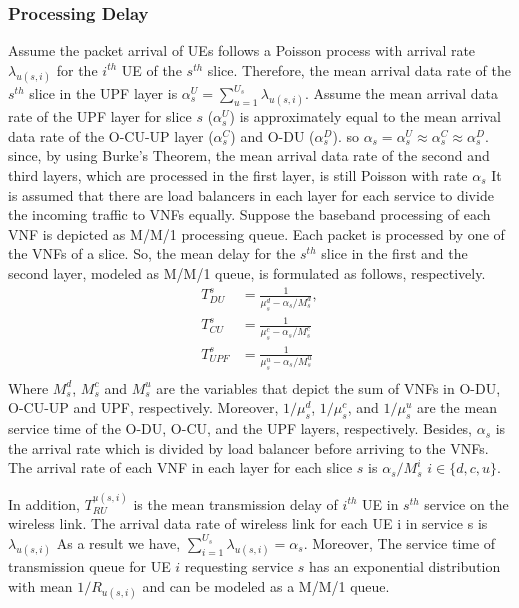 \documentclass[conference]{IEEEtran}
\begin{document}
\subsubsection{Processing Delay}
Assume the packet arrival of UEs follows a Poisson process with arrival rate $\lambda_{u(s,i)}$ for the $i^{th}$ UE of the $s^{th}$ slice.
Therefore, the mean arrival data rate of the $s^{th}$ slice in the UPF layer is $\alpha_{s}^U = \sum_{u=1}^{U_s}\lambda_{u(s,i)}$.
Assume the mean arrival data rate of the UPF layer for slice $s$ ($\alpha_{s}^U$) is approximately equal to the mean arrival data rate of the O-CU-UP layer ($\alpha_{s}^C$) and O-DU ($\alpha_{s}^D$). so $\alpha_{s} =\alpha_{s}^U \approx \alpha_{s}^C \approx \alpha_{s}^D$. since, by using Burke’s Theorem, the mean arrival data rate of the second and third layers, which are processed in the first layer, is still Poisson with rate $\alpha_{s}$
It is assumed that there are load balancers in each layer for each service to divide the incoming traffic to VNFs equally. %
Suppose the baseband processing of each VNF is depicted as M/M/1 processing queue.
Each packet is processed by one of the VNFs of a slice. So, the mean delay for the $s^{th}$ slice in the first and the second layer, modeled as M/M/1 queue, is formulated as follows, respectively.
\begin{equation}
\begin{split}
T_{DU}^{s} &= \frac{1}{\mu_s^d - \alpha_{s}/{M_s^{d}}},\\
T_{CU}^{s} &= \frac{1}{\mu_s^c - \alpha_{s}/{M_s^{c}}}\\
T_{UPF}^{s} &= \frac{1}{\mu_s^u - \alpha_{s}/{M_s^{u}}}\\
\end{split}
\end{equation}
Where $M_s^{d}$, $M_s^{c}$ and 
$M_s^{u}$ are the variables that depict the sum of VNFs in O-DU, O-CU-UP and UPF, respectively. 
Moreover, $1/\mu_s^d$, $1/\mu_s^c$, and $1/\mu_s^u$ are the mean service time of the O-DU, O-CU, and the UPF layers, respectively.
Besides, $\alpha_{s}$ is the  arrival rate which is divided
by load balancer before arriving to the VNFs. The arrival rate of each VNF in each layer for each slice 
$s$ is $\alpha_{s}/{M_s^{i}}$ $ i \in \{d,c, u\}$.

In addition, $T_{RU}^{u(s,i)}$ is the mean transmission delay of $i^{th}$ UE in $s^{th}$ service on the wireless link.
 The arrival data rate of wireless link for each UE i in service s is $\lambda_{u(s,i)}$
As a result we have, $\sum_{i = 1}^{U_s} \lambda_{u(s,i)} = \alpha_s$.
Moreover, The service time of transmission queue for UE $i$ requesting service $s$ has
an exponential distribution with mean $1/R_{u(s,i)}$ and can be modeled as a M/M/1 queue.
 
\end{document}
